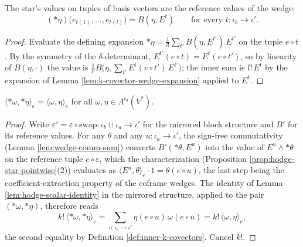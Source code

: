 \begin{lemma}
\label{lem:hodge-star-reproducing}
\leanok
{}
The star's values on tuples of basis vectors are the reference values of the wedge:
\[
({*}\eta)\big(e_{t(1)}, \ldots, e_{t(l)}\big) = B(\eta, E^t) \qquad \text{for every } t \colon \iota_b \to \iota'.
\]
\end{lemma}
\begin{proof}
\leanok
Evaluate the defining expansion ${*}\eta = \frac{1}{l!}\sum_{t'} B(\eta, E^{t'})\, E^{t'}$ on the tuple $e \circ t$. By the symmetry of the $\delta$-determinant, $E^{t'}(e \circ t) = E^{t}(e \circ t')$, so by linearity of $B(\eta, \cdot)$ the value is $\frac{1}{l!} B\big(\eta, \sum_{t'} E^t(e \circ t')\, E^{t'}\big)$; the inner sum is $l!\, E^t$ by the expansion of Lemma \ref{lem:k-covector-wedge-expansion} applied to $E^t$.
\end{proof}

\begin{proposition}
\label{prop:hodge-star-isometry}
\leanok
{}
$\langle {*}\omega, {*}\eta \rangle_e = \langle \omega, \eta \rangle_e$ for all $\omega, \eta \in \Lambda^{\iota_a}(V^*)$.
\end{proposition}
\begin{proof}
\leanok
Write $\varepsilon' = \varepsilon \circ \mathrm{swap} \colon \iota_b \sqcup \iota_a \to \iota'$ for the mirrored block structure and $B'$ for its reference values. For any $\theta$ and any $u \colon \iota_a \to \iota'$, the sign-free commutativity (Lemma \ref{lem:wedge-comm-sum}) converts $B'({*}\theta, E^u)$ into the value of $E^u \wedge {*}\theta$ on the reference tuple $e \circ \varepsilon$, which the characterization (Proposition \ref{prop:hodge-star-pointwise}(2)) evaluates as $\langle E^u, \theta \rangle_e \cdot 1 = \theta(e \circ u)$, the last step being the coefficient-extraction property of the coframe wedges. The identity of Lemma \ref{lem:hodge-scalar-identity} in the mirrored structure, applied to the pair $({*}\omega, {*}\eta)$, therefore reads
\[
k!\, \langle {*}\omega, {*}\eta \rangle_e = \sum_{u \colon \iota_a \to \iota'} \eta(e \circ u)\, \omega(e \circ u) = k!\, \langle \omega, \eta \rangle_e ,
\]
the second equality by Definition \ref{def:inner-k-covectors}. Cancel $k!$.
\end{proof}

